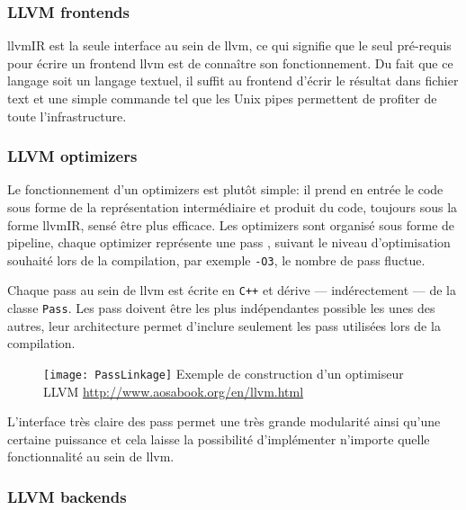 \subsubsection{LLVM \og frontends \fg}

\gls{llvmIR} est la seule interface au sein de \gls{llvm}, ce qui signifie que le seul pré-requis pour écrire un \og frontend \fg \gls{llvm} est de connaître son fonctionnement. Du fait que ce langage soit un langage textuel, il suffit au \og frontend \fg d'écrir le résultat dans fichier text et une simple commande tel que les \og Unix pipes \fg permettent de profiter de toute l'infrastructure.

\subsubsection{LLVM \og optimizers \fg}

Le fonctionnement d'un \og optimizers \fg est plutôt simple: il prend en entrée le code sous forme de la représentation intermédiaire et produit du code, toujours sous la forme \gls{llvmIR}, sensé être plus efficace. Les \og optimizers \fg sont organisé sous forme de pipeline, chaque \og optimizer \fg représente une \og pass \fg, suivant le niveau d'optimisation souhaité lors de la compilation, par exemple \texttt{-O3}, le nombre de \og pass \fg fluctue.

Chaque \og pass \fg au sein de \gls{llvm} est écrite en \texttt{C++} et dérive --- indérectement --- de la classe \texttt{Pass}. Les \og pass \fg doivent être les plus indépendantes possible les unes des autres, leur architecture permet d'inclure seulement les \og pass \fg utilisées lors de la compilation.

\begin{figure}[H]
	\centering
	\texttt{[image: PassLinkage]}
	{Exemple de construction d'un optimiseur LLVM}
	{\url{http://www.aosabook.org/en/llvm.html}}
	\label{fig:PassLinkage}
\end{figure}

L'interface très claire des \og pass \fg permet une très grande modularité ainsi qu'une certaine puissance et cela laisse la possibilité d'implémenter n'importe quelle fonctionnalité au sein de \gls{llvm}.

\subsubsection{LLVM \og backends \fg}


